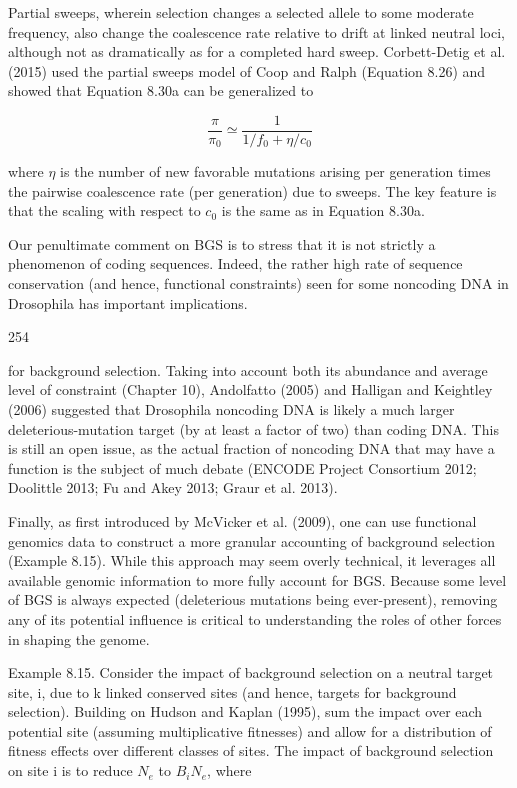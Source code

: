 \documentclass{article}
\begin{document}
Partial sweeps, wherein selection changes a selected allele to some moderate frequency, also change the coalescence rate relative to drift at linked neutral loci, although not as dramatically as for a completed hard sweep. Corbett-Detig et al. (2015) used the partial sweeps model of Coop and Ralph (Equation 8.26) and showed that Equation 8.30a can be generalized to

\begin{equation}
\frac{\pi}{\pi_{0}}\simeq\frac{1}{1/f_{0}+\eta/c_{0}}
\tag{8.30b}
\label{eq:8_30b}
\end{equation}

where  $ \eta $ is the number of new favorable mutations arising per generation times the pairwise coalescence rate (per generation) due to sweeps. The key feature is that the scaling with respect to  $ c_0 $ is the same as in Equation 8.30a.

Our penultimate comment on BGS is to stress that it is not strictly a phenomenon of coding sequences. Indeed, the rather high rate of sequence conservation (and hence, functional constraints) seen for some noncoding DNA in Drosophila has important implications.

254

for background selection. Taking into account both its abundance and average level of constraint (Chapter 10), Andolfatto (2005) and Halligan and Keightley (2006) suggested that Drosophila noncoding DNA is likely a much larger deleterious-mutation target (by at least a factor of two) than coding DNA. This is still an open issue, as the actual fraction of noncoding DNA that may have a function is the subject of much debate (ENCODE Project Consortium 2012; Doolittle 2013; Fu and Akey 2013; Graur et al. 2013).

Finally, as first introduced by McVicker et al. (2009), one can use functional genomics data to construct a more granular accounting of background selection (Example 8.15). While this approach may seem overly technical, it leverages all available genomic information to more fully account for BGS. Because some level of BGS is always expected (deleterious mutations being ever-present), removing any of its potential influence is critical to understanding the roles of other forces in shaping the genome.

Example 8.15. Consider the impact of background selection on a neutral target site, i, due to k linked conserved sites (and hence, targets for background selection). Building on Hudson and Kaplan (1995), sum the impact over each potential site (assuming multiplicative fitnesses) and allow for a distribution of fitness effects over different classes of sites. The impact of background selection on site i is to reduce  $ N_e $ to  $ B_i N_e $, where
\end{document}
